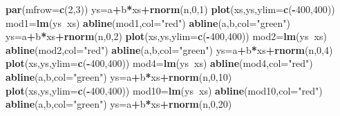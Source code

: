 \documentclass[
]{book}
\newenvironment{Shaded}{\begin{snugshade}}{\end{snugshade}}
\newcommand{\DataTypeTok}[1]{\textcolor[rgb]{0.13,0.29,0.53}{#1}}
\newcommand{\DecValTok}[1]{\textcolor[rgb]{0.00,0.00,0.81}{#1}}
\newcommand{\KeywordTok}[1]{\textcolor[rgb]{0.13,0.29,0.53}{\textbf{#1}}}
\newcommand{\NormalTok}[1]{#1}
\newcommand{\OperatorTok}[1]{\textcolor[rgb]{0.81,0.36,0.00}{\textbf{#1}}}
\newcommand{\StringTok}[1]{\textcolor[rgb]{0.31,0.60,0.02}{#1}}
\begin{document}
\begin{Shaded}
\begin{Highlighting}[]
\KeywordTok{par}\NormalTok{(}\DataTypeTok{mfrow=}\KeywordTok{c}\NormalTok{(}\DecValTok{2}\NormalTok{,}\DecValTok{3}\NormalTok{))}
\NormalTok{ys=a}\OperatorTok{+}\NormalTok{b}\OperatorTok{*}\NormalTok{xs}\OperatorTok{+}\KeywordTok{rnorm}\NormalTok{(n,}\DecValTok{0}\NormalTok{,}\DecValTok{1}\NormalTok{)}
\KeywordTok{plot}\NormalTok{(xs,ys,}\DataTypeTok{ylim=}\KeywordTok{c}\NormalTok{(}\OperatorTok{-}\DecValTok{400}\NormalTok{,}\DecValTok{400}\NormalTok{))}
\NormalTok{mod1=}\KeywordTok{lm}\NormalTok{(ys}\OperatorTok{~}\NormalTok{xs)}
\KeywordTok{abline}\NormalTok{(mod1,}\DataTypeTok{col=}\StringTok{"red"}\NormalTok{)}
\KeywordTok{abline}\NormalTok{(a,b,}\DataTypeTok{col=}\StringTok{"green"}\NormalTok{)}
\NormalTok{ys=a}\OperatorTok{+}\NormalTok{b}\OperatorTok{*}\NormalTok{xs}\OperatorTok{+}\KeywordTok{rnorm}\NormalTok{(n,}\DecValTok{0}\NormalTok{,}\DecValTok{2}\NormalTok{)}
\KeywordTok{plot}\NormalTok{(xs,ys,}\DataTypeTok{ylim=}\KeywordTok{c}\NormalTok{(}\OperatorTok{-}\DecValTok{400}\NormalTok{,}\DecValTok{400}\NormalTok{))}
\NormalTok{mod2=}\KeywordTok{lm}\NormalTok{(ys}\OperatorTok{~}\NormalTok{xs)}
\KeywordTok{abline}\NormalTok{(mod2,}\DataTypeTok{col=}\StringTok{"red"}\NormalTok{)}
\KeywordTok{abline}\NormalTok{(a,b,}\DataTypeTok{col=}\StringTok{"green"}\NormalTok{)}
\NormalTok{ys=a}\OperatorTok{+}\NormalTok{b}\OperatorTok{*}\NormalTok{xs}\OperatorTok{+}\KeywordTok{rnorm}\NormalTok{(n,}\DecValTok{0}\NormalTok{,}\DecValTok{4}\NormalTok{)}
\KeywordTok{plot}\NormalTok{(xs,ys,}\DataTypeTok{ylim=}\KeywordTok{c}\NormalTok{(}\OperatorTok{-}\DecValTok{400}\NormalTok{,}\DecValTok{400}\NormalTok{))}
\NormalTok{mod4=}\KeywordTok{lm}\NormalTok{(ys}\OperatorTok{~}\NormalTok{xs)}
\KeywordTok{abline}\NormalTok{(mod4,}\DataTypeTok{col=}\StringTok{"red"}\NormalTok{)}
\KeywordTok{abline}\NormalTok{(a,b,}\DataTypeTok{col=}\StringTok{"green"}\NormalTok{)}
\NormalTok{ys=a}\OperatorTok{+}\NormalTok{b}\OperatorTok{*}\NormalTok{xs}\OperatorTok{+}\KeywordTok{rnorm}\NormalTok{(n,}\DecValTok{0}\NormalTok{,}\DecValTok{10}\NormalTok{)}
\KeywordTok{plot}\NormalTok{(xs,ys,}\DataTypeTok{ylim=}\KeywordTok{c}\NormalTok{(}\OperatorTok{-}\DecValTok{400}\NormalTok{,}\DecValTok{400}\NormalTok{))}
\NormalTok{mod10=}\KeywordTok{lm}\NormalTok{(ys}\OperatorTok{~}\NormalTok{xs)}
\KeywordTok{abline}\NormalTok{(mod10,}\DataTypeTok{col=}\StringTok{"red"}\NormalTok{)}
\KeywordTok{abline}\NormalTok{(a,b,}\DataTypeTok{col=}\StringTok{"green"}\NormalTok{)}
\NormalTok{ys=a}\OperatorTok{+}\NormalTok{b}\OperatorTok{*}\NormalTok{xs}\OperatorTok{+}\KeywordTok{rnorm}\NormalTok{(n,}\DecValTok{0}\NormalTok{,}\DecValTok{20}\NormalTok{)}

\end{Highlighting}
\end{Shaded}
\end{document}
